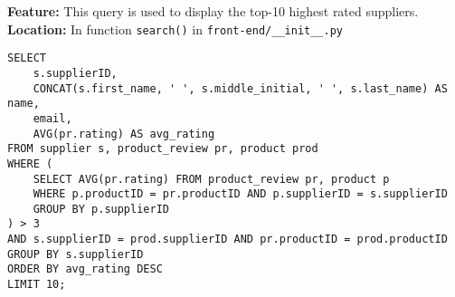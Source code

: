 \textbf{Feature:} This query is used to display the top-10 highest rated suppliers. \\
\textbf{Location:} In function \texttt{search()} in \texttt{front-end/\_\_init\_\_.py}

\begin{lstlisting}
SELECT
    s.supplierID,
    CONCAT(s.first_name, ' ', s.middle_initial, ' ', s.last_name) AS name,
    email,
    AVG(pr.rating) AS avg_rating
FROM supplier s, product_review pr, product prod
WHERE (
    SELECT AVG(pr.rating) FROM product_review pr, product p
    WHERE p.productID = pr.productID AND p.supplierID = s.supplierID
    GROUP BY p.supplierID
) > 3
AND s.supplierID = prod.supplierID AND pr.productID = prod.productID
GROUP BY s.supplierID
ORDER BY avg_rating DESC
LIMIT 10;
\end{lstlisting}
